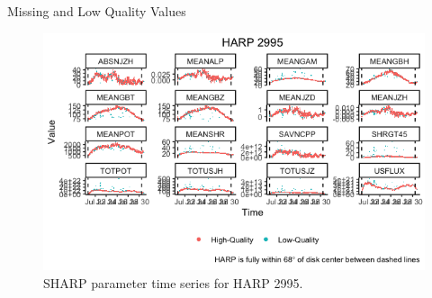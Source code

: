 \documentclass{beamer}
\begin{document}
\begin{frame}{Missing and Low Quality Values}
    \begin{figure}[!htb]
        \centering
        \includegraphics[scale=0.5]{harp2995.png}
        \caption{SHARP parameter time series for HARP 2995.}
        \label{fig:na_props_flux}
    \end{figure}
\end{frame}


\end{document}
